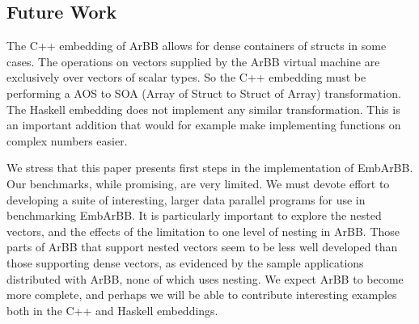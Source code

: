 

\subsection{Future Work} 
\label{sec:FutureWork}







The C++ embedding of ArBB allows for dense containers of structs in some cases. 
The operations on vectors supplied by the ArBB virtual machine are exclusively 
over vectors of scalar types. So the C++ embedding must be performing a AOS to SOA 
(Array of Struct to Struct of Array) transformation. The Haskell embedding 
does not implement any similar transformation. This is an important addition 
that would for example make implementing functions on complex numbers easier. 

We stress that this paper presents first steps in the implementation of 
EmbArBB. Our benchmarks, while promising, are very limited. We must devote 
effort to developing a suite of interesting, larger data parallel programs 
for use in benchmarking EmbArBB. It is particularly important to explore the 
nested vectors, and the effects of the limitation to one level of nesting 
in ArBB. Those parts of ArBB that support nested vectors seem to be less well 
developed than those supporting dense vectors, as evidenced by the sample 
applications distributed with ArBB, none of which uses nesting. We expect 
ArBB to become more complete, and perhaps we will be able to contribute 
interesting examples both in the C++ and Haskell embeddings.

